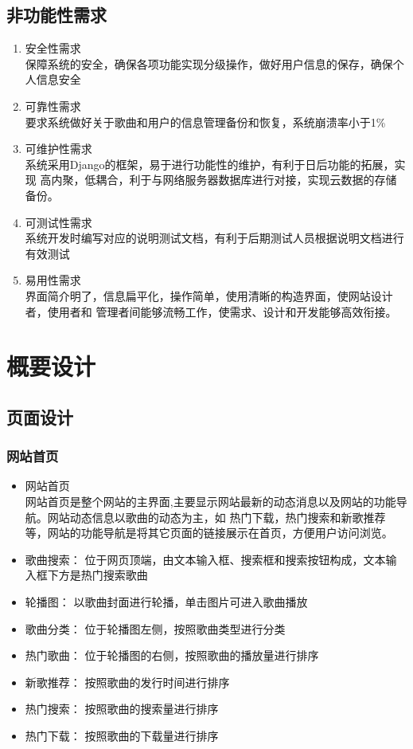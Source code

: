 \documentclass[UTF8,14pt]{article}
\numberwithin{figure}{subsubsection}
\numberwithin{table}{subsubsection}
\begin{document}
\subsection{非功能性需求}
\begin{enumerate}
	\setlength{\itemsep}{0pt}
	      \setlength{\parsep}{0pt}
	      \setlength{\parskip}{0pt}
	\item 安全性需求\\
	      保障系统的安全，确保各项功能实现分级操作，做好用户信息的保存，确保个人信息安全
	\item 可靠性需求\\
	      要求系统做好关于歌曲和用户的信息管理备份和恢复，系统崩溃率小于1\%
	\item 可维护性需求\\
	      系统采用Django的框架，易于进行功能性的维护，有利于日后功能的拓展，实现
	      高内聚，低耦合，利于与网络服务器数据库进行对接，实现云数据的存储备份。
	\item 可测试性需求\\
	      系统开发时编写对应的说明测试文档，有利于后期测试人员根据说明文档进行有效测试
	\item 易用性需求\\
	      界面简介明了，信息扁平化，操作简单，使用清晰的构造界面，使网站设计者，使用者和
	      管理者间能够流畅工作，使需求、设计和开发能够高效衔接。
\end{enumerate}
\section{概要设计}
\subsection{页面设计}
\vspace*{-0.3cm}
\subsubsection{网站首页}
\begin{itemize}
	\setlength{\itemsep}{0pt}
	      \setlength{\parsep}{0pt}
	      \setlength{\parskip}{0pt}
	\item 网站首页\\
	      网站首页是整个网站的主界面,主要显示网站最新的动态消息以及网站的功能导航。网站动态信息以歌曲的动态为主，如
	      热门下载，热门搜索和新歌推荐等，网站的功能导航是将其它页面的链接展示在首页，方便用户访问浏览。
	\item 歌曲搜索：
	      位于网页顶端，由文本输入框、搜索框和搜索按钮构成，文本输入框下方是热门搜索歌曲
	\item 轮播图：
	      以歌曲封面进行轮播，单击图片可进入歌曲播放
	\item 歌曲分类：
	      位于轮播图左侧，按照歌曲类型进行分类
	\item 热门歌曲：
	      位于轮播图的右侧，按照歌曲的播放量进行排序
	\item 新歌推荐：
	      按照歌曲的发行时间进行排序
	\item 热门搜索：
	      按照歌曲的搜索量进行排序
	\item 热门下载：
	      按照歌曲的下载量进行排序
\end{itemize}
\vspace*{-0.3cm}
\end{document}
